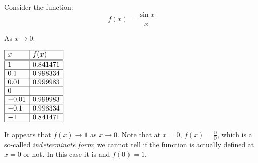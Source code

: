 \documentclass[letterpaper,12pt,fleqn]{article}
\begin{document}
\begin{example}
  Consider the function:
  \[f(x)=\frac{\sin x}{x}\]

  \bigskip

  \begin{center}
  \end{center}

  As \(x\to0\):

  \begin{center}
    \(\begin{array}{|l|l|}
    \hline
    x & f(x) \\
    \hline
    \hline
    1 & 0.841471 \\
    \hline
    0.1 & 0.998334 \\
    \hline
    0.01 & 0.999983 \\
    \hline
    0 & \\
    \hline
    -0.01 & 0.999983 \\
    \hline
    -0.1 & 0.998334 \\
    \hline
    -1 & 0.841471 \\
    \hline
    \end{array}\)
  \end{center}

  \bigskip

  It appears that \(f(x)\to1\) as \(x\to0\).  Note that at \(x=0\), \(f(x)=\frac{0}{0}\), which is a so-called
  \emph{indeterminate form}; we cannot tell if the function is actually defined at \(x=0\) or not.  In this case
  it is and \(f(0)=1\).
\end{example}
\end{document}
